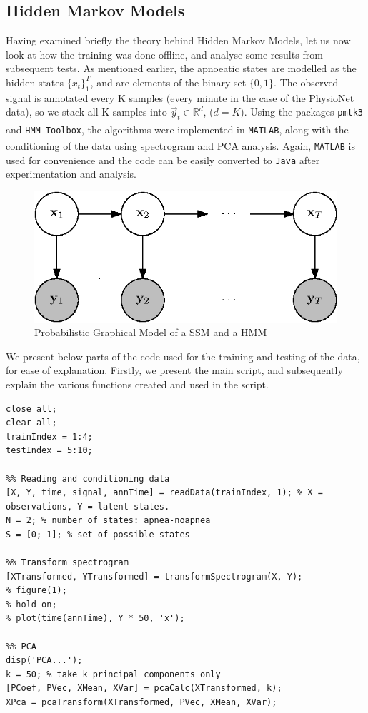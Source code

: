 \subsection{Hidden Markov Models}

Having examined briefly the theory behind Hidden Markov Models, let us now look at how the training was done offline, and analyse some results from subsequent tests. As mentioned earlier, the apnoeatic states are modelled as the hidden states $\{x_t\}_1^T$, and are elements of the binary set $\{0, 1\}$. The observed signal is annotated every K samples (every minute in the case of the PhysioNet data), so we stack all K samples into $\vec y_t \in \mathbb{R}^d$, ($d = K$). Using the packages \verb!pmtk3! and \verb!HMM Toolbox!, the algorithms were implemented in \verb!MATLAB!\textsuperscript{\textregistered}, along with the conditioning of the data using spectrogram and PCA analysis. Again, \verb!MATLAB!\textsuperscript{\textregistered} is used for convenience and the code can be easily converted to \verb!Java! after experimentation and analysis.

\begin{figure}[h!]
		\centering
			\includegraphics{drawings/pgm.eps}
		\caption{Probabilistic Graphical Model of a SSM and a HMM}
		\label{fig:pgm}
	\end{figure}

We present below parts of the code used for the training and testing of the data, for ease of explanation. Firstly, we present the main script, and subsequently explain the various functions created and used in the script.

\begin{lstlisting}
close all;
clear all;
trainIndex = 1:4;
testIndex = 5:10;

%% Reading and conditioning data
[X, Y, time, signal, annTime] = readData(trainIndex, 1); % X = observations, Y = latent states.
N = 2; % number of states: apnea-noapnea
S = [0; 1]; % set of possible states

%% Transform spectrogram
[XTransformed, YTransformed] = transformSpectrogram(X, Y);
% figure(1);
% hold on;
% plot(time(annTime), Y * 50, 'x');

%% PCA
disp('PCA...');
k = 50; % take k principal components only
[PCoef, PVec, XMean, XVar] = pcaCalc(XTransformed, k);
XPca = pcaTransform(XTransformed, PVec, XMean, XVar);
\end{lstlisting}

